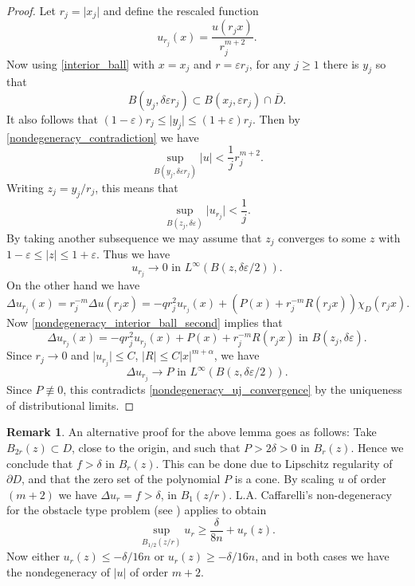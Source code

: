 \documentclass[11pt,a4paper]{amsart}
\theoremstyle{definition}
\newtheorem{Remark}[Theorem]{Remark}
\numberwithin{equation}{section}
\newcommand{\abs}[1]{\lvert #1 \rvert}          %
\newcommand{\ol}[1]{\overline{#1}}
\newcommand{\eps}{\varepsilon}
\begin{document}
\begin{proof}
Let $r_j = \abs{x_j}$ and define the rescaled function 
\[
u_{r_j}(x) = \frac{u(r_j x)}{r_j^{m+2}}.
\]
Now using \eqref{interior_ball} with $x=x_j$ and $r = \eps r_j$, for any $j \geq 1$ there is $y_j$ so that 
\begin{equation} \label{nondegeneracy_interior_ball_second}
B(y_j, \delta \eps r_j) \subset B(x_j, \eps r_j) \cap \ol{D}.
\end{equation}
It also follows that $(1-\eps) r_j \leq \abs{y_j} \leq (1+\eps) r_j$. Then by \eqref{nondegeneracy_contradiction} we have 
\[
\sup_{B(y_j, \delta \eps r_j)} \abs{u} < \frac{1}{j} r_j^{m+2}.
\]
Writing $z_j = y_j/r_j$, this means that 
\[
\sup_{B(z_j, \delta \eps)} \abs{u_{r_j}} < \frac{1}{j}.
\]
By taking another subsequence we may assume that $z_j$ converges to some $z$ with $1-\eps \leq \abs{z} \leq 1+\eps$. Thus we have 
\begin{equation} \label{nondegeneracy_uj_convergence}
u_{r_j} \to 0 \text{ in $L^{\infty}(B(z, \delta \eps/2))$}.
\end{equation}
On the other hand we have 
\[
\Delta u_{r_j}(x) = r_j^{-m} \Delta u(r_j x) = -q r_j^2 u_{r_j}(x) + (P(x) + r_j^{-m} R(r_j x)) \chi_D(r_j x).
\]
Now \eqref{nondegeneracy_interior_ball_second} implies that 
\[
\Delta u_{r_j}(x) = -q r_j^2 u_{r_j}(x) + P(x) + r_j^{-m} R(r_j x) \text{ in $B(z_j, \delta \eps)$}.
\]
Since $r_j \to 0$ and $\abs{u_{r_j}} \leq C$, $\abs{R} \leq C \abs{x}^{m+\alpha}$, we have 
\[
\Delta u_{r_j} \to P \text{ in $L^{\infty}(B(z, \delta \eps/2))$}.
\]
Since $P \not\equiv 0$, this contradicts \eqref{nondegeneracy_uj_convergence} by the uniqueness of distributional limits.
\end{proof}


\begin{Remark}
        An alternative proof for the above lemma goes as follows: 
Take $B_{2r}(z) \subset D$, close to the origin, and such that $P > 2\delta > 0$ in $B_r(z)$. Hence we conclude that $f > \delta  $ in $B_r(z)$.
 This can be done due to Lipschitz regularity of $\partial D$, and that the zero set of the polynomial $P$ is a cone. By  scaling $u$ of order $(m+2)$  we have 
$\Delta u_r = f >  \delta  $, in $B_1(z/r)$. 
 L.A. Caffarelli's non-degeneracy for the obstacle type problem (see \cite[Lemma 3.1]{PSU}) applies to obtain 
 $$
 \sup_{B_{1/2}(z/r)} u_r \geq  \frac{\delta}{8n}  + u_r(z) .
 $$
 Now either  $  u_r (z) \leq  -\delta /16n $ or 
 $ u_r (z) \geq  - \delta/16n $, and in both cases 
 we have the  nondegeneracy  of $|u|$ of order $m+2$.
 \end{Remark}
\end{document}
